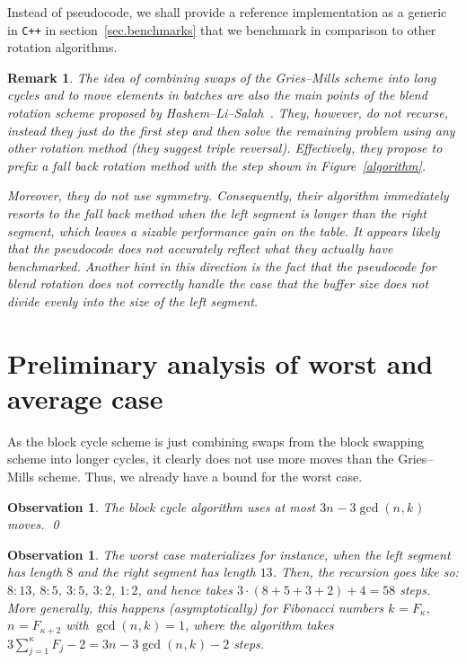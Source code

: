 \documentclass[12pt,a4paper]{article}
\newtheorem{rem}[lemma]{Remark}
\newtheorem{obs}[lemma]{Observation}
\newcommand{\fibindex}{\kappa}
\newcommand{\Size}[1][]{n_{#1}}
\newcommand{\Shift}[1][]{k_{#1}}
\newcommand{\gcdOf}[1]{\gcd(#1)}
\begin{document}
  Instead of pseudocode, we shall provide a reference implementation
  as a generic in \verb-C++- in section~\ref{sec.benchmarks} that we
  benchmark in comparison to other rotation algorithms.
  \begin{rem}
    The idea of combining swaps of the Gries--Mills scheme into long
    cycles and to move elements in batches are also the main points of the
    blend rotation scheme proposed by
    Hashem--Li--Salah~\cite[Algorithm~3]{HashemLiSalah23}.  They, however,
    do not recurse, instead they just do the first step and then solve the
    remaining problem using any other rotation method (they suggest triple
    reversal).  Effectively, they propose to prefix a fall back rotation
    method with the step shown in Figure~\ref{algorithm}.

    Moreover, they do not use symmetry. Consequently, their algorithm
    immediately resorts to the fall back method when the left segment is
    longer than the right segment, which leaves a sizable
    performance gain on the table. It appears likely that the
    pseudocode does not accurately reflect what they actually have
    benchmarked. Another hint in this direction is the fact that the
    pseudocode for blend rotation does not correctly handle the case that
    the buffer size does not divide evenly into the size of the left
    segment.
  \end{rem}

  \section{Preliminary analysis of worst and average case}\label{sec.linear-term}
  As the block cycle scheme is just combining swaps from the block
  swapping scheme into longer cycles, it clearly does not use more moves
  than the Gries--Mills scheme. Thus, we already have a bound for the
  worst case.
  \begin{obs}
    The block cycle algorithm uses at most $3\Size - 3\gcd(\Size,\Shift)$ moves. \qed
  \end{obs}
  \begin{obs}\label{fib-worst}
    The worst case materializes for instance, when the left segment
    has length $8$ and the right segment has length $13$.  Then, the
    recursion goes like so: $8:13$, $8:5$, $3:5$, $3:2$, $1:2$,
    and hence takes $3\cdot(8+5+3+2) + 4 = 58$ steps.
    More generally, this happens (asymptotically) for Fibonacci
    numbers $\Shift = F_{\fibindex}$, $\Size = F_{\fibindex+2}$ with
    $\gcdOf{\Size,\Shift} = 1$, where the algorithm takes
    $3 \sum_{j=1}^{\fibindex} F_j - 2 = 3 \Size - 3\gcdOf{\Size,\Shift} - 2$ steps.
  \end{obs}
\end{document}
